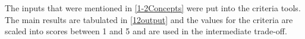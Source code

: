 The inputs that were mentioned in \autoref{1-2Concepts} were put into the criteria tools. The main results are tabulated in \autoref{12output} and the values for the criteria are scaled into scores between 1 and 5 and are used in the intermediate trade-off.  


